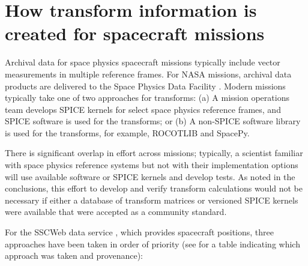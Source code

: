 \documentclass[draft]{agujournal2019}
\begin{document}
\clearpage

\section{How transform information is created for spacecraft missions}
\label{sect:missions}

Archival data for space physics spacecraft missions typically include vector measurements in multiple reference frames. For NASA missions, archival data products are delivered to the Space Physics Data Facility \cite{SPDF}. Modern missions typically take one of two approaches for transforms: (a) A mission operations team develops SPICE kernels for select space physics reference frames, and SPICE software is used for the transforms; or (b) A non-SPICE software library is used for the transforms, for example, ROCOTLIB and SpacePy. 

There is significant overlap in effort across missions; typically, a scientist familiar with space physics reference systems but not with their implementation options will use available software or SPICE kernels and develop tests. As noted in the conclusions, this effort to develop and verify transform calculations would not be necessary if either a database of transform matrices or versioned SPICE kernels were available that were accepted as a community standard. 

For the SSCWeb data service \cite{SSCWeb}, which provides spacecraft positions, three approaches have been taken in order of priority (see  for a table indicating which approach was taken and provenance):
\end{document}

